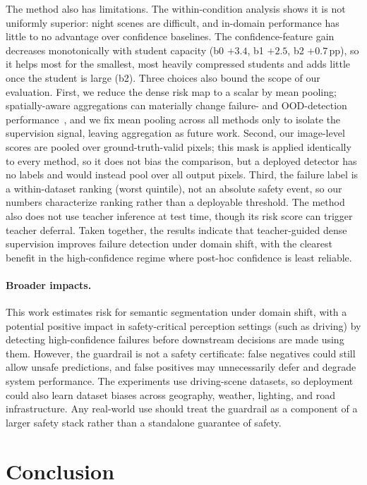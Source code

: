 \documentclass{article}
\begin{document}
The method also has limitations. The within-condition analysis shows it is not uniformly superior: night scenes are difficult, and in-domain performance has little to no advantage over confidence baselines. The confidence-feature gain decreases monotonically with student capacity (b0 $+3.4$, b1 $+2.5$, b2 $+0.7$\,pp), so it helps most for the smallest, most heavily compressed students and adds little once the student is large (b2). Three choices also bound the scope of our evaluation. First, we reduce the dense risk map to a scalar by mean pooling; spatially-aware aggregations can materially change failure- and OOD-detection performance~\citep{guarino2026aggregation}, and we fix mean pooling across all methods only to isolate the supervision signal, leaving aggregation as future work. Second, our image-level scores are pooled over ground-truth-valid pixels; this mask is applied identically to every method, so it does not bias the comparison, but a deployed detector has no labels and would instead pool over all output pixels. Third, the failure label is a within-dataset ranking (worst quintile), not an absolute safety event, so our numbers characterize ranking rather than a deployable threshold. The method also does not use teacher inference at test time, though its risk score can trigger teacher deferral. Taken together, the results indicate that teacher-guided dense supervision improves failure detection under domain shift, with the clearest benefit in the high-confidence regime where post-hoc confidence is least reliable.

\paragraph{Broader impacts.}
This work estimates risk for semantic segmentation under domain shift, with a potential positive impact in safety-critical perception settings (such as driving) by detecting high-confidence failures before downstream decisions are made using them. However, the guardrail is not a safety certificate: false negatives could still allow unsafe predictions, and false positives may unnecessarily defer and degrade system performance. The experiments use driving-scene datasets, so deployment could also learn dataset biases across geography, weather, lighting, and road infrastructure. Any real-world use should treat the guardrail as a component of a larger safety stack rather than a standalone guarantee of safety.


\section{Conclusion}
\end{document}
